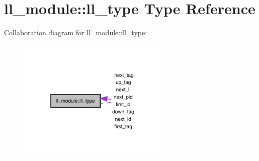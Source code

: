 \hypertarget{structll__module_1_1ll__type}{}\section{ll\+\_\+module\+:\+:ll\+\_\+type Type Reference}
\label{structll__module_1_1ll__type}


Collaboration diagram for ll\+\_\+module\+:\+:ll\+\_\+type\+:
\nopagebreak
\begin{figure}[H]
\begin{center}
\leavevmode
\includegraphics[width=205pt]{structll__module_1_1ll__type__coll__graph}
\end{center}
\end{figure}
